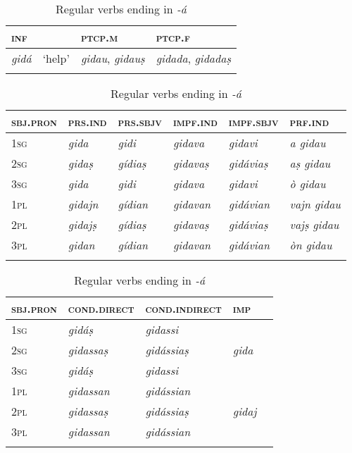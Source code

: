 \begin{table}
	\caption{Regular verbs ending in \textit{-á}}
	\label{conja}
	\begin{tabularx}{.7\textwidth}{llll}
		
		\lsptoprule
		\textsc{inf} & & \textsc{ptcp.m}  & \textsc{ptcp.f}\\
		\midrule
		\textit{gidá} & `help' & \textit{gidau}, \textit{gidauṣ} & \textit{gidada}, \textit{gidadaṣ}\\
		\lspbottomrule  
	\end{tabularx}
	
	\medskip
	
	\begin{tabularx}{\textwidth}{p{2cm}lllll}
		\lsptoprule
		\textsc{sbj.pron} &\textsc{prs.ind} &\textsc{prs.sbjv} &\textsc{impf.ind} & \textsc{impf.sbjv} &\textsc{prf.ind}\\
		\midrule
		\textsc{1sg} & \textit{gida} & \textit{gidi} & \textit{gidava} & \textit{gidavi} & \textit{a gidau}  \\
		\textsc{2sg} & \textit{gidaṣ} & \textit{gídiaṣ} & \textit{gidavaṣ} & \textit{gidáviaṣ} & \textit{aṣ gidau}\\
		\textsc{3sg} & \textit{gida} & \textit{gidi} & \textit{gidava} & \textit{gidavi}  & \textit{ò gidau} \\
		\textsc{1pl} & \textit{gidajn} & \textit{gídian} & \textit{gidavan} & \textit{gidávian} & \textit{vajn gidau} \\
		\textsc{2pl} & \textit{gidajṣ} & \textit{gídiaṣ} & \textit{gidavaṣ}  & \textit{gidáviaṣ} & \textit{vajṣ gidau} \\
		\textsc{3pl} & \textit{gidan}  & \textit{gídian} & \textit{gidavan} & \textit{gidávian} & \textit{òn gidau}\\
		\lspbottomrule
	\end{tabularx}
	
	\medskip
	
	\begin{tabularx} {\textwidth}{p{2cm}XXXX}
		\lsptoprule
		\textsc{sbj.pron} &\textsc{cond.direct} &  \textsc{cond.indirect} & \textsc{imp}\\
		\midrule
		\textsc{1sg} & \textit{gidáṣ} & \textit{gidassi}\\
		\textsc{2sg} & \textit{gidassaṣ} & \textit{gidássiaṣ} & \textit{gida}\\
		\textsc{3sg} & \textit{gidáṣ} &  \textit{gidassi}\\
		\textsc{1pl} & \textit{gidassan} & \textit{gidássian}\\
		\textsc{2pl} & \textit{gidassaṣ} & \textit{gidássiaṣ}  & \textit{gidaj}\\
		\textsc{3pl} & \textit{gidassan}  & \textit{gidássian} \\
		\lspbottomrule
	\end{tabularx} 
\end{table}



